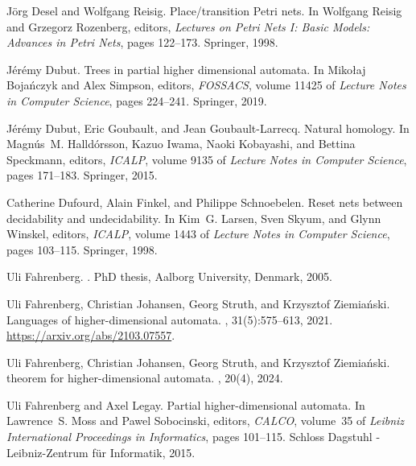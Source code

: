 \documentclass[runningheads,envcountsame]{llncs}
\begin{document}
\begin{thebibliography}{10}
J{\"o}rg Desel and Wolfgang Reisig.
\newblock Place/transition {Petri} nets.
\newblock In Wolfgang Reisig and Grzegorz Rozenberg, editors, {\em Lectures on
  Petri Nets I: Basic Models: Advances in Petri Nets}, pages 122--173.
  {Springer}, 1998.

J{\'{e}}r{\'{e}}my Dubut.
\newblock Trees in partial higher dimensional automata.
\newblock In Miko{\l}aj Boja{\'{n}}czyk and Alex Simpson, editors, {\em
  FOSSACS}, volume 11425 of {\em {Lecture Notes in Computer Science}}, pages
  224--241. {Springer}, 2019.

J{\'{e}}r{\'{e}}my Dubut, Eric Goubault, and Jean Goubault{-}Larrecq.
\newblock Natural homology.
\newblock In Magn{\'{u}}s~M. Halld{\'{o}}rsson, Kazuo Iwama, Naoki Kobayashi,
  and Bettina Speckmann, editors, {\em ICALP}, volume 9135 of {\em {Lecture
  Notes in Computer Science}}, pages 171--183. {Springer}, 2015.

Catherine Dufourd, Alain Finkel, and Philippe Schnoebelen.
\newblock Reset nets between decidability and undecidability.
\newblock In Kim~G. Larsen, Sven Skyum, and Glynn Winskel, editors, {\em
  ICALP}, volume 1443 of {\em {Lecture Notes in Computer Science}}, pages
  103--115. {Springer}, 1998.

Uli Fahrenberg.
.
\newblock PhD thesis, Aalborg University, Denmark, 2005.

Uli Fahrenberg, Christian Johansen, Georg Struth, and Krzysztof Ziemia{\'n}ski.
\newblock Languages of higher-dimensional automata.
, 31(5):575--613,
  2021.
\newblock \url{https://arxiv.org/abs/2103.07557}.

Uli Fahrenberg, Christian Johansen, Georg Struth, and Krzysztof Ziemia{\'n}ski.
 theorem for higher-dimensional automata.
, 20(4), 2024.

Uli Fahrenberg and Axel Legay.
\newblock Partial higher-dimensional automata.
\newblock In Lawrence~S. Moss and Pawel Sobocinski, editors, {\em CALCO},
  volume~35 of {\em {Leibniz International Proceedings in Informatics}}, pages
  101--115. Schloss Dagstuhl - Leibniz-Zentrum f{\"{u}}r Informatik, 2015.


\end{thebibliography}
\end{document}
